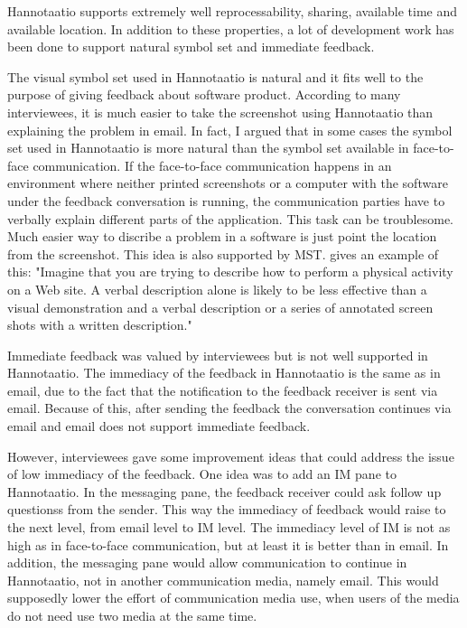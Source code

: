 \documentclass[english,12pt,a4paper,pdftex]{article}
\begin{document}
Hannotaatio supports extremely well reprocessability, sharing, available time and available location. In addition to these properties, a lot of development work has been done to support natural symbol set and immediate feedback. 

The visual symbol set used in Hannotaatio is natural and it fits well to the purpose of giving feedback about software product. According to many interviewees, it is much easier to take the screenshot using Hannotaatio than explaining the problem in email. In fact, I argued that in some cases the symbol set used in Hannotaatio is more natural than the symbol set available in face-to-face communication. If the face-to-face communication happens in an environment where neither printed screenshots or a computer with the software under the feedback conversation is running, the communication parties have to verbally explain different parts of the application. This task can be troublesome. Much easier way to discribe a problem in a software is just point the location from the screenshot. This idea is also supported by \ac{MST}. \citet{dennis2008} gives an example of this: "Imagine that you are trying to describe how to perform a physical activity on a Web site. A verbal description alone is likely to be less effective than a visual demonstration and a verbal description or a series of annotated screen shots with a written description."

Immediate feedback was valued by interviewees but is not well supported in Hannotaatio. The immediacy of the feedback in Hannotaatio is the same as in email, due to the fact that the notification to the feedback receiver is sent via email. Because of this, after sending the feedback the conversation continues via email and email does not support immediate feedback.

However, interviewees gave some improvement ideas that could address the issue of low immediacy of the feedback. One idea was to add an \acl{IM} pane to Hannotaatio. In the messaging pane, the feedback receiver could ask follow up questionss from the sender. This way the immediacy of feedback would raise to the next level, from email level to \ac{IM} level. The immediacy level of \ac{IM} is not as high as in face-to-face communication, but at least it is better than in email. In addition, the messaging pane would allow communication to continue in Hannotaatio, not in another communication media, namely email. This would supposedly lower the effort of communication media use, when users of the media do not need use two media at the same time.
\end{document}
